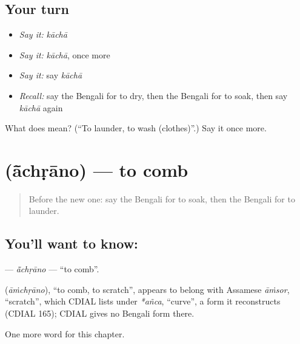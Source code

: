 \subsection*{Your turn}
\begin{itemize}
\raggedright
  \item \emph{Say it:} \emph{kāchā}
  \item \emph{Say it:} \emph{kāchā}, once more
  \item \emph{Say it:} say \emph{kāchā}
  \item \emph{Recall:} say the Bengali for to dry, then the Bengali for to soak, then say \emph{kāchā} again
\end{itemize}

\begin{tcolorbox}[breakable,colback=teal!4,colframe=teal!35!black,title={Before you move on}]
What does  mean? (\textquotedblleft{}To launder, to wash (clothes)\textquotedblright{}.) Say it once more.
\end{tcolorbox}
\section[\texorpdfstring{\bn{আঁচড়ানো} (ā̃chṛāno)}{আঁচড়ানো (ā̃chṛāno)}]{ (ā̃chṛāno) — to comb}

\label{lesson:BN-C152-achrano}



\begin{quote}
Before the new one: say the Bengali for to soak, then the Bengali for to launder.
\end{quote}

\subsection*{You'll want to know: }
\textbf{} — \emph{ā̃chṛāno} — \textquotedblleft{}to comb\textquotedblright{}.

\begin{cousinweb}
\textbf{} (\emph{āṁchṛāno}), \textquotedblleft{}to comb, to scratch\textquotedblright{}, appears to belong with Assamese \emph{āṁsor}, \textquotedblleft{}scratch\textquotedblright{}, which CDIAL lists under \emph{*añca}, \textquotedblleft{}curve\textquotedblright{}, a form it reconstructs (CDIAL 165); CDIAL gives no Bengali form there.
\end{cousinweb}

\begin{grammarlens}[title={What you've built}]
One more word for this chapter.
\end{grammarlens}

